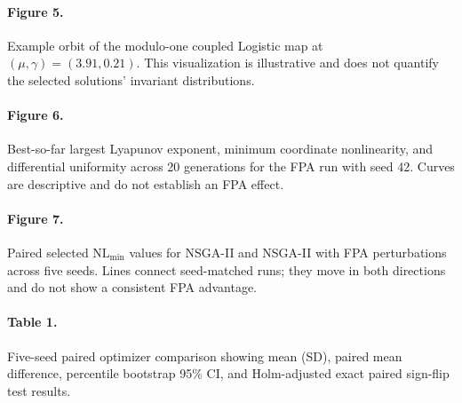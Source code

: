 \documentclass[11pt,a4paper]{article}
\begin{document}
\paragraph{Figure 5.} Example orbit of the modulo-one coupled Logistic
map at $(\mu,\gamma)=(3.91,0.21)$. This visualization is illustrative
and does not quantify the selected solutions' invariant distributions.

\paragraph{Figure 6.} Best-so-far largest Lyapunov exponent, minimum
coordinate nonlinearity, and differential uniformity across 20
generations for the FPA run with seed 42. Curves are descriptive and
do not establish an FPA effect.

\paragraph{Figure 7.} Paired selected $\mathrm{NL}_{\min}$ values for
NSGA-II and NSGA-II with FPA perturbations across five seeds. Lines
connect seed-matched runs; they move in both directions and do not
show a consistent FPA advantage.

\paragraph{Table 1.} Five-seed paired optimizer comparison showing
mean (SD), paired mean difference, percentile bootstrap 95\% CI, and
Holm-adjusted exact paired sign-flip test results.
\end{document}

